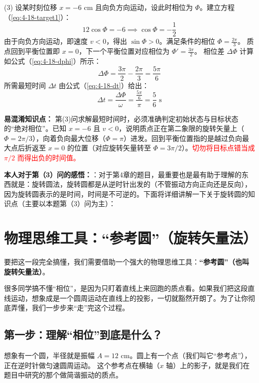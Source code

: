(3) 设某时刻位移 $x = -6 \text{ cm}$ 且向负方向运动，设此时相位为 $\Phi$。建立方程（\ref{eq:4-18-target1}）：
\begin{equation}\label{eq:4-18-target1}
	12 \cos\Phi = -6 \implies \cos\Phi = -\frac{1}{2}
\end{equation}
由于向负方向运动，即速度 $v < 0$，得出 $\sin\Phi > 0$。满足条件的相位 $\Phi = \frac{2\pi}{3}$。
质点回到平衡位置即 $x = 0$，下一个平衡位置对应相位为 $\Phi' = \frac{3\pi}{2}$。
相位差 $\Delta\Phi$ 计算如公式（\ref{eq:4-18-dphi}）所示：
\begin{equation}\label{eq:4-18-dphi}
	\Delta\Phi = \frac{3\pi}{2} - \frac{2\pi}{3} = \frac{5\pi}{6}
\end{equation}
所需最短时间 $\Delta t$ 由公式（\ref{eq:4-18-dt}）给出：
\begin{equation}\label{eq:4-18-dt}
	\Delta t = \frac{\Delta\Phi}{\omega} = \frac{\frac{5\pi}{6}}{\pi} = \frac{5}{6} \text{ s}
\end{equation}

\textbf{易混淆知识点： }
第(3)问求解最短时间时，必须准确判定初始状态与目标状态的“绝对相位”。已知 $x=-6$ 且 $v<0$，说明质点正在第二象限的旋转矢量上（$\Phi=2\pi/3$），向着负向最大位移（$\Phi=\pi$）进发。回到平衡位置指的是越过负向最大点后折返至 $x=0$ 的位置（对应旋转矢量转至 $\Phi=3\pi/2$）。\textcolor{red}{切勿将目标点错当成 $\pi/2$ 而得出负的时间值。}

\textbf{本人对于第（3）问的感悟：}：对于第4章的题目，最重要也是最有助于理解的东西就是：旋转圆法，旋转圆都是从逆时针出发的（不管振动方向正向还是反向），因为旋转圆表示的是时间，时间是不可逆的。下面将详细讲解一下关于旋转圆的知识点（主要以本题第（3）问为主）：
\section*{物理思维工具：“参考圆”（旋转矢量法）}

要把这一段完全搞懂，我们需要借助一个强大的物理思维工具：\textbf{“参考圆”（也叫旋转矢量法）}。

很多同学搞不懂“相位”，是因为只盯着直线上来回跑的质点看。如果我们把这段直线运动，想象成是一个圆周运动在直线上的投影，一切就豁然开朗了。为了让你彻底弄懂，我们一步步来“走”完这个过程。

\subsection*{第一步：理解“相位”到底是什么？}

想象有一个圆，半径就是振幅 $A = 12\text{ cm}$。圆上有一个点（我们叫它“参考点”），正在逆时针做匀速圆周运动。
这个参考点在横轴（$x$ 轴）上的影子，就是我们在题目中研究的那个做简谐振动的质点。

